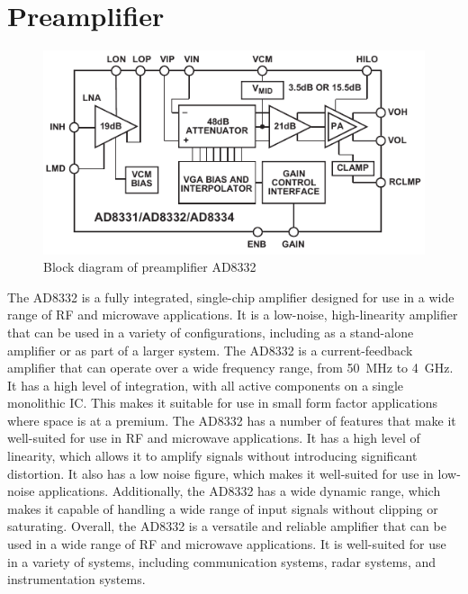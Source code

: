 \section{Preamplifier}
\begin{figure}[htbp]
	\centering
	\includegraphics[width=.8\textwidth]{Figures/3_ad8332_block.pdf}
	\caption{Block diagram of preamplifier AD8332 \cite{AD8332}}
	\label{fig:3_preamplifier_block}
\end{figure}
The AD8332\cite{AD8332} is a fully integrated, single-chip amplifier designed for use in a wide range of RF and microwave applications. It is a low-noise, high-linearity amplifier that can be used in a variety of configurations, including as a stand-alone amplifier or as part of a larger system. The AD8332 is a current-feedback amplifier that can operate over a wide frequency range, from \qty{50}{\mega\hertz} to \qty{4}{\giga\hertz}. It has a high level of integration, with all active components on a single monolithic IC. This makes it suitable for use in small form factor applications where space is at a premium. The AD8332 has a number of features that make it well-suited for use in RF and microwave applications. It has a high level of linearity, which allows it to amplify signals without introducing significant distortion. It also has a low noise figure, which makes it well-suited for use in low-noise applications. Additionally, the AD8332 has a wide \gls{dynamic range}, which makes it capable of handling a wide range of input signals without clipping or saturating. Overall, the AD8332 is a versatile and reliable amplifier that can be used in a wide range of RF and microwave applications. It is well-suited for use in a variety of systems, including communication systems, radar systems, and instrumentation systems.

